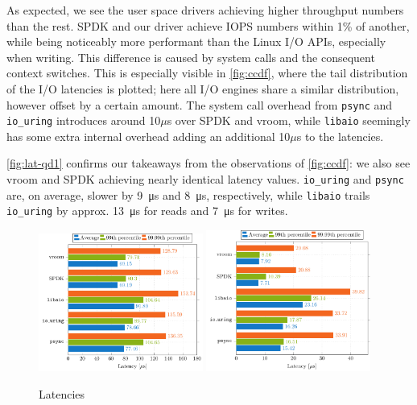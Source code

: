As expected, we see the user space drivers achieving higher throughput numbers than the rest. SPDK and our driver achieve IOPS numbers within 1\% of another, while being noticeably more performant than the Linux I/O APIs, especially when writing. This difference is caused by system calls and the consequent context switches. This is especially visible in \autoref{fig:ccdf}, where the tail distribution of the I/O latencies is plotted; here all I/O engines share a similar distribution, however offset by a certain amount. The system call overhead from \texttt{psync} and \texttt{io\_uring} introduces around 10$\mu$s over SPDK and vroom, while \texttt{libaio} seemingly has some extra internal overhead adding an additional 10$\mu$s to the latencies.

\autoref{fig:lat-qd1} confirms our takeaways from the observations of \autoref{fig:ccdf}: we also see vroom and SPDK achieving nearly identical latency values. \texttt{io\_uring} and \texttt{psync} are, on average, slower by \qty{9}{\micro\second} and \qty{8}{\micro\second}, respectively, while \texttt{libaio} trails \texttt{io\_uring} by approx. \qty{13}{\micro\second} for reads and \qty{7}{\micro\second} for writes.

\begin{figure}
  \centering
   {\includegraphics[width=0.48\textwidth]{figures/latency-read-xbar} \label{fig:lat-read}}
   {\includegraphics[width=0.48\textwidth]{figures/latency-write-xbar} \label{fig:lat-write}}
  \caption{Latencies}
  \label{fig:lat-qd1}
\end{figure}
